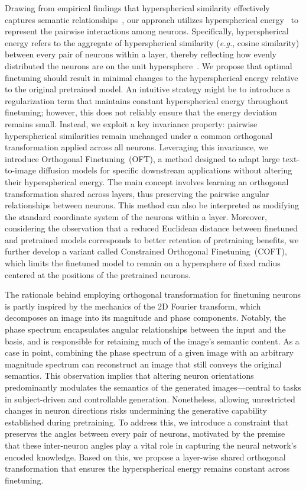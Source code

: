 Drawing from empirical findings that hyperspherical similarity effectively captures semantic relationships~\cite{liu2017deep,liu2018decoupled,chen2020angular}, our approach utilizes hyperspherical energy~\cite{liu2018learning} to represent the pairwise interactions among neurons. Specifically, hyperspherical energy refers to the aggregate of hyperspherical similarity (\emph{e.g.}, cosine similarity) between every pair of neurons within a layer, thereby reflecting how evenly distributed the neurons are on the unit hypersphere~\cite{liu2021learning}. We propose that optimal finetuning should result in minimal changes to the hyperspherical energy relative to the original pretrained model. An intuitive strategy might be to introduce a regularization term that maintains constant hyperspherical energy throughout finetuning; however, this does not reliably ensure that the energy deviation remains small. Instead, we exploit a key invariance property: pairwise hyperspherical similarities remain unchanged under a common orthogonal transformation applied across all neurons. Leveraging this invariance, we introduce Orthogonal Finetuning~(OFT), a method designed to adapt large text-to-image diffusion models for specific downstream applications without altering their hyperspherical energy. The main concept involves learning an orthogonal transformation shared across layers, thus preserving the pairwise angular relationships between neurons. This method can also be interpreted as modifying the standard coordinate system of the neurons within a layer. Moreover, considering the observation that a reduced Euclidean distance between finetuned and pretrained models corresponds to better retention of pretraining benefits, we further develop a variant called Constrained Orthogonal Finetuning~(COFT), which limits the finetuned model to remain on a hypersphere of fixed radius centered at the positions of the pretrained neurons.

The rationale behind employing orthogonal transformation for finetuning neurons is partly inspired by the mechanics of the 2D Fourier transform, which decomposes an image into its magnitude and phase components. Notably, the phase spectrum encapsulates angular relationships between the input and the basis, and is responsible for retaining much of the image’s semantic content. As a case in point, combining the phase spectrum of a given image with an arbitrary magnitude spectrum can reconstruct an image that still conveys the original semantics. This observation implies that altering neuron orientations predominantly modulates the semantics of the generated images—central to tasks in subject-driven and controllable generation. Nonetheless, allowing unrestricted changes in neuron directions risks undermining the generative capability established during pretraining. To address this, we introduce a constraint that preserves the angles between every pair of neurons, motivated by the premise that these inter-neuron angles play a vital role in capturing the neural network’s encoded knowledge. Based on this, we propose a layer-wise shared orthogonal transformation that ensures the hyperspherical energy remains constant across finetuning.

